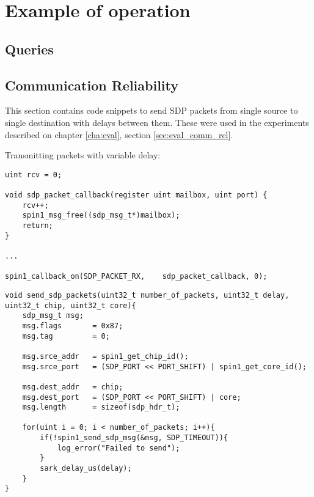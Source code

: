 \chapter{Example of operation}

\section{Queries}
\label{sec:appendix-queries}



\section{Communication Reliability}
\label{sec:appendix_comm_rel}

This section contains code snippets to send SDP packets from single source to single destination with delays between them. These were used in the experiments described on chapter \ref{cha:eval}, section \ref{sec:eval_comm_rel}.

Transmitting packets with variable delay:

\begin{lstlisting}[caption={Source}]
uint rcv = 0;

void sdp_packet_callback(register uint mailbox, uint port) {
    rcv++;
    spin1_msg_free((sdp_msg_t*)mailbox);
    return;
}

...

spin1_callback_on(SDP_PACKET_RX,    sdp_packet_callback, 0);

\end{lstlisting}

\begin{lstlisting}[caption={Destination}]
void send_sdp_packets(uint32_t number_of_packets, uint32_t delay, uint32_t chip, uint32_t core){
	sdp_msg_t msg;
    msg.flags       = 0x87;
    msg.tag         = 0;

    msg.srce_addr   = spin1_get_chip_id();
    msg.srce_port   = (SDP_PORT << PORT_SHIFT) | spin1_get_core_id();

    msg.dest_addr   = chip;
    msg.dest_port   = (SDP_PORT << PORT_SHIFT) | core;
    msg.length 		= sizeof(sdp_hdr_t);

    for(uint i = 0; i < number_of_packets; i++){
    	if(!spin1_send_sdp_msg(&msg, SDP_TIMEOUT)){
        	log_error("Failed to send");
        }
        sark_delay_us(delay);
    }
}
\end{lstlisting}

